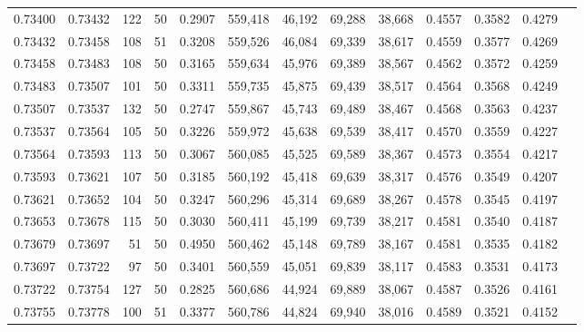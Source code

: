 \begin{tabular}{rrrrrrrrrrrrr}
0.73400 & 0.73432 &   122 &  50 &                                     0.2907 & 559,418 &  46,192 &  69,288 &  38,668 & 0.4557 & 0.3582 & 0.4279 \\
0.73432 & 0.73458 &   108 &  51 &                                     0.3208 & 559,526 &  46,084 &  69,339 &  38,617 & 0.4559 & 0.3577 & 0.4269 \\
0.73458 & 0.73483 &   108 &  50 &                                     0.3165 & 559,634 &  45,976 &  69,389 &  38,567 & 0.4562 & 0.3572 & 0.4259 \\
0.73483 & 0.73507 &   101 &  50 &                                     0.3311 & 559,735 &  45,875 &  69,439 &  38,517 & 0.4564 & 0.3568 & 0.4249 \\
0.73507 & 0.73537 &   132 &  50 &                                     0.2747 & 559,867 &  45,743 &  69,489 &  38,467 & 0.4568 & 0.3563 & 0.4237 \\
0.73537 & 0.73564 &   105 &  50 &                                     0.3226 & 559,972 &  45,638 &  69,539 &  38,417 & 0.4570 & 0.3559 & 0.4227 \\
0.73564 & 0.73593 &   113 &  50 &                                     0.3067 & 560,085 &  45,525 &  69,589 &  38,367 & 0.4573 & 0.3554 & 0.4217 \\
0.73593 & 0.73621 &   107 &  50 &                                     0.3185 & 560,192 &  45,418 &  69,639 &  38,317 & 0.4576 & 0.3549 & 0.4207 \\
0.73621 & 0.73652 &   104 &  50 &                                     0.3247 & 560,296 &  45,314 &  69,689 &  38,267 & 0.4578 & 0.3545 & 0.4197 \\
0.73653 & 0.73678 &   115 &  50 &                                     0.3030 & 560,411 &  45,199 &  69,739 &  38,217 & 0.4581 & 0.3540 & 0.4187 \\
0.73679 & 0.73697 &    51 &  50 &                                     0.4950 & 560,462 &  45,148 &  69,789 &  38,167 & 0.4581 & 0.3535 & 0.4182 \\
0.73697 & 0.73722 &    97 &  50 &                                     0.3401 & 560,559 &  45,051 &  69,839 &  38,117 & 0.4583 & 0.3531 & 0.4173 \\
0.73722 & 0.73754 &   127 &  50 &                                     0.2825 & 560,686 &  44,924 &  69,889 &  38,067 & 0.4587 & 0.3526 & 0.4161 \\
0.73755 & 0.73778 &   100 &  51 &                                     0.3377 & 560,786 &  44,824 &  69,940 &  38,016 & 0.4589 & 0.3521 & 0.4152 \\

\end{tabular}
